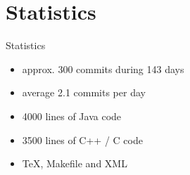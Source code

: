 \section{Statistics}
\begin{frame}{Statistics}
	\begin{itemize}
		\item approx. 300 commits during 143 days
		\item average 2.1 commits per day
		\item 4000 lines of Java code
		\item 3500 lines of C++ / C code
		\item TeX, Makefile and XML
	\end{itemize}
\end{frame}